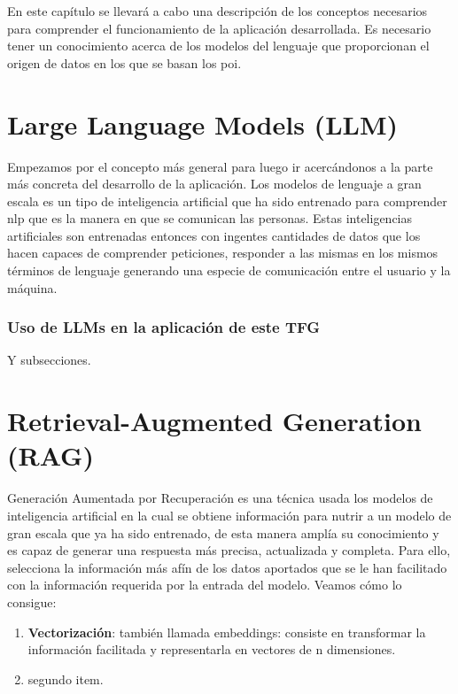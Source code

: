 
En este capítulo se llevará a cabo una descripción de los conceptos necesarios para comprender el funcionamiento de la aplicación desarrollada. Es necesario tener un conocimiento acerca de los modelos del lenguaje que proporcionan el origen de datos en los que se basan los \acrfull{poi}.



\section{Large Language Models (LLM)}

Empezamos por el concepto más general para luego ir acercándonos a la parte más concreta del desarrollo de la aplicación. Los modelos de lenguaje a gran escala es un tipo de inteligencia artificial que ha sido entrenado para comprender \acrfull{nlp} que es la manera en que se comunican las personas. Estas inteligencias artificiales son entrenadas entonces con ingentes cantidades de datos que los hacen capaces de comprender peticiones, responder a las mismas en los mismos términos de lenguaje generando una especie de comunicación entre el usuario y la máquina.



\subsubsection{Uso de LLMs en la aplicación de este TFG}

Y subsecciones. 


\section{Retrieval-Augmented Generation (RAG)}
Generación Aumentada por Recuperación es una técnica usada los modelos de inteligencia artificial en la cual se obtiene información para nutrir a un modelo de gran escala que ya ha sido entrenado, de esta manera amplía su conocimiento y es capaz de generar una respuesta más precisa, actualizada y completa. Para ello, selecciona la información más afín de los datos aportados que se le han facilitado con la información requerida por la entrada del modelo. Veamos cómo lo consigue:
\begin{enumerate}
	\item \textbf{Vectorización}: también llamada embeddings: consiste en transformar la información facilitada y representarla en vectores de n dimensiones.
	\item segundo item.
\end{enumerate}

